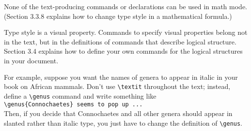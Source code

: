 \documentclass{article}
\begin{document}
None of the text-producing commands or declarations can be used in math mode. (Section 3.3.8
explains how to change type style in a mathematical formula.)

Type style is a visual property. Commands to specify visual properties belong not in the text, but
in the definitions of commands that describe logical structure. Section 3.4 explains how to define
your own commands for the logical structures in your document. 


For example, suppose you want the names of genera to appear in italic in your book on African
mammals. Don't use \verb:\textit: throughout the text; instead, define a \verb:\genus: command and
write something like \\
\verb:\genus{Connochaetes} seems to pop up ...: \\
\noindent Then, if you decide that Connochaetes and all other genera should appear in slanted rather
 than italic type, you just have to change the definition of \verb:\genus:.


\end{document}
